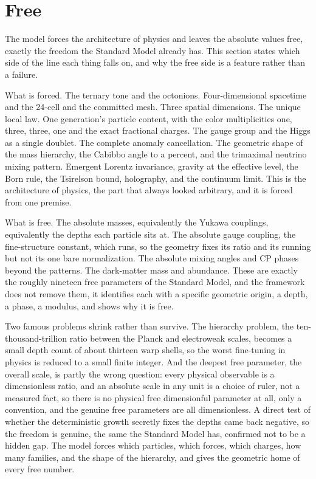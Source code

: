 \section{Free}

The model forces the architecture of physics and leaves the absolute values free, exactly the freedom the
Standard Model already has. This section states which side of the line each thing falls on, and why the free side is a feature rather than a
failure.

What is forced. The ternary tone and the octonions. Four-dimensional spacetime and the 24-cell and the committed
mesh. Three spatial dimensions. The unique local law. One generation's particle content, with the color
multiplicities one, three, three, one and the exact fractional charges. The gauge group and the Higgs as a single
doublet. The complete anomaly cancellation. The geometric shape of the mass hierarchy, the Cabibbo angle to a percent,
and the trimaximal neutrino mixing pattern. Emergent Lorentz invariance, gravity at the effective level, the Born rule,
the Tsirelson bound, holography, and the continuum limit. This is the architecture of physics, the part that always
looked arbitrary, and it is forced from one premise.

What is free. The absolute masses, equivalently the Yukawa couplings, equivalently the depths each particle sits at. The
absolute gauge coupling, the fine-structure constant, which runs, so the geometry fixes its ratio and its running but not
its one bare normalization. The absolute mixing angles and CP phases beyond the patterns. The dark-matter mass and
abundance. These are exactly the roughly nineteen free parameters of the Standard Model, and the framework does not
remove them, it identifies each with a specific geometric origin, a depth, a phase, a modulus, and shows why it is free.

Two famous problems shrink rather than survive. The hierarchy problem, the ten-thousand-trillion ratio between the
Planck and electroweak scales, becomes a small depth count of about thirteen warp shells, so the worst fine-tuning in
physics is reduced to a small finite integer. And the deepest free parameter, the overall scale, is partly the wrong
question: every physical observable is a dimensionless ratio, and an absolute scale in any unit is a choice of ruler, not
a measured fact, so there is no physical free dimensionful parameter at all, only a convention, and the genuine free
parameters are all dimensionless. A direct test of whether the deterministic growth secretly fixes the depths came back
negative, so the freedom is genuine, the same the Standard Model has, confirmed not to be a hidden gap. The model forces
which particles, which forces, which charges, how many families, and the shape of the hierarchy, and gives the
geometric home of every free number.
